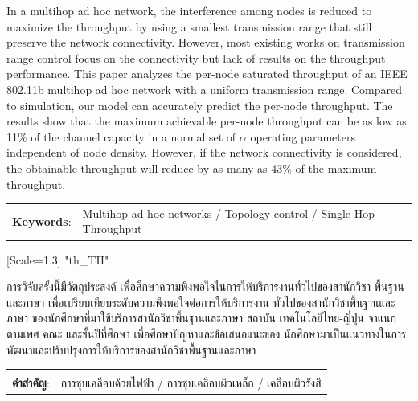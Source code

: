 \documentclass[12pt,oneside,openright,a4paper]{cpe-thai-project}
\begin{document}
\makesignaturepage 

\abstract

In a multihop ad hoc network, the interference among nodes is
  reduced to maximize the throughput by using a smallest transmission
  range that still preserve the network connectivity. However, most
  existing works on transmission range control focus on the
  connectivity but lack of results on the throughput performance. This
  paper analyzes the per-node saturated throughput of an IEEE 802.11b
  multihop ad hoc network with a uniform transmission range. Compared
  to simulation, our model can accurately predict the per-node
  throughput.  The results show that the maximum achievable per-node
  throughput can be as low as 11\% of the channel capacity in a normal
  set of $\alpha$ operating parameters independent of node density. However, if
  the network connectivity is considered, the obtainable throughput
  will reduce by as many as 43\% of the maximum throughput. 

\begin{flushleft}
\begin{tabular*}{\textwidth}{@{}lp{}}
\textbf{Keywords}: & Multihop ad hoc networks / Topology control / Single-Hop Throughput
\end{tabular*}
\end{flushleft}
\endabstract

{\newfontfamily{}[Scale=1.3]
\XeTeXlinebreaklocale "th_TH"	
\thaifont
\thaiabstract

การวิจัยครั้งนี้มีวัตถุประสงค์  เพื่อศึกษาความพึงพอใจในการให้บริการงานทั่วไปของสานักวิชา พื้นฐานและภาษา เพื่อเปรียบเทียบระดับความพึงพอใจต่อการให้บริการงาน ทั่วไปของสานักวิชาพื้นฐานและภาษา ของนักศึกษาที่มาใช้บริการสานักวิชาพื้นฐานและภาษา สถาบัน เทคโนโลยีไทย-ญี่ปุ่น จาแนกตามเพศ คณะ และชั้นปีที่ศึกษา เพื่อศึกษาปัญหาและข้อเสนอแนะของ นักศึกษามาเป็นแนวทางในการพัฒนาและปรับปรุงการให้บริการของสานักวิชาพื้นฐานและภาษา

\begin{flushleft}
\begin{tabular*}{\textwidth}{@{}lp{}}
 & \\

\textbf{คำสำคัญ}: & การชุบเคลือบด้วยไฟฟ้า / การชุบเคลือบผิวเหล็ก /  เคลือบผิวรังสี
\end{tabular*}
\end{flushleft}
\endabstract
}
\end{document}
